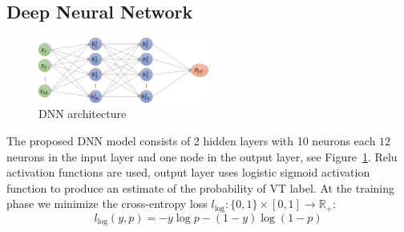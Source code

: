 \subsection{Deep Neural Network}
\label{sec:dnn}

\begin{figure}[t]
	\centering
	\includegraphics[width=0.5\textwidth]{figures/dnn_graph.png}
	\caption{DNN architecture}
	\label{fig:dnn_graph}
\end{figure}

The proposed DNN model consists of 2 hidden layers with 10 neurons 
each $12$ 
neurons in the input layer and one node in the output layer, see 
Figure~\ref{fig:dnn_graph}.
Relu activation functions are used, output layer uses logistic 
sigmoid activation function to produce an estimate of the probability 
of VT label.
At the training phase we minimize the cross-entropy loss 
$l_{\log}:\{0,1\}\times[0,1]\rightarrow\mathbb{R}_{+}$:
\begin{equation}
l_{\log}(y,p)= -y\log p - (1-y)\log(1-p)
\end{equation}

